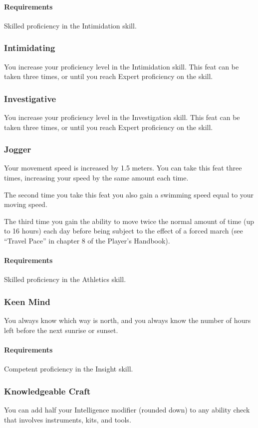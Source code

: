     \paragraph{Requirements} Skilled proficiency in the Intimidation skill.
\subsubsection{Intimidating} \label{feat::intimidating}
    You increase your proficiency level in the Intimidation skill.
    This feat can be taken three times, or until you reach Expert proficiency on the skill.
\subsubsection{Investigative} \label{feat::investigative}
    You increase your proficiency level in the Investigation skill.
    This feat can be taken three times, or until you reach Expert proficiency on the skill.
\subsubsection{Jogger} \label{feat::jogger}
    Your movement speed is increased by 1.5 meters.
    You can take this feat three times, increasing your speed by the same amount each time.

    The second time you take this feat you also gain a swimming speed equal to your moving speed.

    The third time you gain the ability to move twice the normal amount of time (up to 16 hours) each day before being subject to the effect of a forced march (see ``Travel Pace'' in chapter 8 of the Player's Handbook).
    \paragraph{Requirements} Skilled proficiency in the Athletics skill.
\subsubsection{Keen Mind} \label{feat::keenmind}
    You always know which way is north, and you always know the number of hours left before the next sunrise or sunset.
    \paragraph{Requirements} Competent proficiency in the Insight skill.
\subsubsection{Knowledgeable Craft} \label{feat::knowledgeablecraft}
    You can add half your Intelligence modifier (rounded down) to any ability check that involves instruments, kits, and tools.
